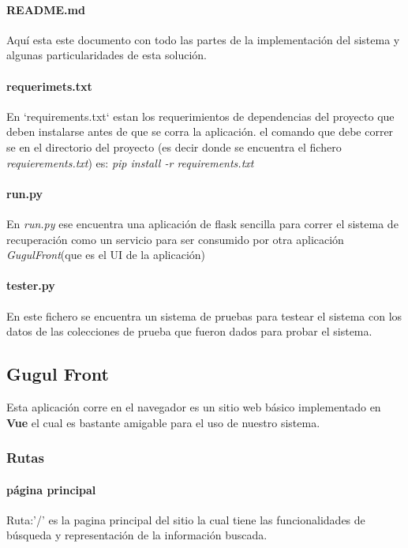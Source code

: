 \documentclass{llncs}
\begin{document}
\paragraph{README.md} Aqu\'i  esta este documento con todo las partes de la implementaci\'on del sistema y algunas particularidades de esta soluci\'on.

\paragraph{requerimets.txt}
En `requirements.txt` estan los requerimientos de dependencias del proyecto que deben instalarse antes de que se corra la aplicaci\'on. el comando que debe correr se en el directorio del proyecto (es decir donde se encuentra el fichero \textit{requierements.txt}) es: \textit{pip install -r requirements.txt}


\paragraph{run.py} 
En \textit{run.py} ese encuentra una aplicaci\'on de flask sencilla para correr el sistema de recuperaci\'on como un servicio para ser consumido por otra aplicaci\'on \textit{GugulFront}(que es el UI de la aplicaci\'on)

\paragraph{tester.py} 
En este fichero se encuentra un sistema de pruebas para testear el sistema con los datos de las colecciones de prueba que fueron dados para probar el sistema.


\subsection{Gugul Front}

Esta aplicaci\'on corre en el navegador es un sitio web b\'asico implementado en \textbf{Vue} el cual es bastante amigable para el uso de nuestro sistema. 

\subsubsection{Rutas}

\paragraph{p\'agina principal} 
Ruta:'/' es la pagina principal del sitio la cual tiene las funcionalidades de b\'usqueda y representaci\'on de la informaci\'on buscada.
\end{document}
